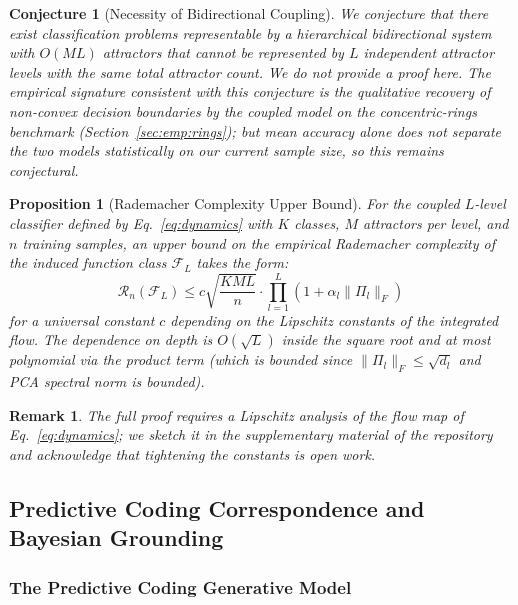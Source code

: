 \documentclass[11pt,a4paper]{article}
\newtheorem{proposition}[theorem]{Proposition}
\newtheorem{remark}[theorem]{Remark}
\newtheorem{conjecture}[theorem]{Conjecture}
\begin{document}
\begin{conjecture}[Necessity of Bidirectional Coupling]
\label{prop:bidi_necessary}
We conjecture that there exist classification problems representable by a hierarchical
bidirectional system with $O(ML)$ attractors that cannot be represented by $L$ independent
attractor levels with the same total attractor count. We do not provide a proof here. The
empirical signature consistent with this conjecture is the qualitative recovery of
non-convex decision boundaries by the coupled model on the concentric-rings benchmark
(Section~\ref{sec:emp:rings}); but mean accuracy alone does not separate the two models
statistically on our current sample size, so this remains conjectural.
\end{conjecture}

\begin{proposition}[Rademacher Complexity Upper Bound]
\label{prop:rademacher}
For the coupled $L$-level classifier defined by Eq.~\ref{eq:dynamics} with $K$ classes,
$M$ attractors per level, and $n$ training samples, an upper bound on the empirical
Rademacher complexity of the induced function class $\mathcal{F}_L$ takes the form:
\begin{equation}
  \mathcal{R}_n(\mathcal{F}_L) \le c \sqrt{\frac{KML}{n}}
    \cdot \prod_{l=1}^{L}(1 + \alpha_l\|\Pi_l\|_F)
\end{equation}
for a universal constant $c$ depending on the Lipschitz constants of the integrated flow.
The dependence on depth is $O(\sqrt{L})$ inside the square root and at most polynomial via
the product term (which is bounded since $\|\Pi_l\|_F \le \sqrt{d_l}$ and PCA spectral
norm is bounded).
\end{proposition}

\begin{remark}
The full proof requires a Lipschitz analysis of the flow map of Eq.~\ref{eq:dynamics}; we
sketch it in the supplementary material of the repository and acknowledge that tightening
the constants is open work.
\end{remark}

\subsection{Predictive Coding Correspondence and Bayesian Grounding}
\label{sec:theory:bayes}

\subsubsection{The Predictive Coding Generative Model}
\end{document}
